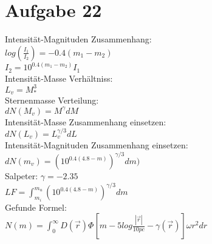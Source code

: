\section{Aufgabe 22}
Intensität-Magnituden Zusammenhang:\\
$log(\frac{I_1}{I_2}) = -0.4(m_1 - m_2)$\\
$I_2 = 10^{0.4(m_1-m_2)}I_1$ \\
Intensität-Masse Verhältniss:\\
$L_v = M_*^3$\\
Sternenmasse Verteilung:\\
$dN(M_v) = M^\gamma dM$ \\
Intensität-Masse Zusammenhang einsetzen: \\
$dN(L_v) = L_v^{\gamma/3} dL$ \\
Intensität-Magnituden Zusammenhang einsetzen: \\
$dN(m_v) = \left (10^{0.4(4.8 - m)} \right)^{\gamma/3} dm)$ \\
Salpeter: $\gamma = -2.35$\\
$LF  = \int_{m_i}^{m_u} \left (10^{0.4(4.8 - m)} \right)^{\gamma/3} dm$\\

Gefunde Formel:\\
$N(m) = \int_{0}^{\infty} D(\vec r)\Phi\left [ m-5log \frac{|\vec r|}{10pc} -\gamma(\vec r) \right ] \omega r^2 dr$

